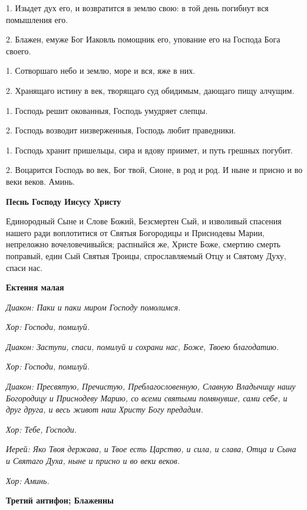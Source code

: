 1. Изыдет дух его, и возвратится в землю свою: в той день погибнут вся помышления его. 


2. Блажен, емуже Бог Иаковль помощник его, упование его на Господа Бога своего. 


1. Сотворшаго небо и землю, море и вся, яже в них. 


2. Хранящаго истину в век, творящаго суд обидимым, дающаго пищу алчущим. 


1. Господь решит окованныя, Господь умудряет слепцы. 


2. Господь возводит низверженныя, Господь любит праведники. 


1. Господь хранит пришельцы, сира и вдову приимет, и путь грешных погубит. 


2. Воцарится Господь во век, Бог твой, Сионе, в род и род. И ныне и присно и во веки веков. Аминь. 


\medskip
\bfseries Песнь Господу Иисусу Христу \normalfont{}\nopagebreak


Единородный Сыне и Слове Божий, Безсмертен Сый, и изволивый спасения нашего ради воплотитися от Святыя Богородицы и Приснодевы Марии, непреложно вочеловечивыйся; распныйся же, Христе Боже, смертию смерть поправый, един Сый Святыя Троицы, спрославляемый Отцу и Святому Духу, спаси нас. 


\medskip
\bfseries Ектения малая \normalfont{}\nopagebreak


\itshape Диакон:\normalfont{} Паки и паки миром Господу помолимся. 


\itshape Хор:\normalfont{} Господи, помилуй. 


\itshape Диакон:\normalfont{} Заступи, спаси, помилуй и сохрани нас, Боже, Твоею благодатию. 


\itshape Хор:\normalfont{} Господи, помилуй. 


\itshape Диакон:\normalfont{} Пресвятую, Пречистую, Преблагословенную, Славную Владычицу нашу Богородицу и Приснодеву Марию, со всеми святыми помянувше, сами себе, и друг друга, и весь живот наш Христу Богу предадим.


\itshape Хор:\normalfont{} Тебе, Господи. 


\itshape Иерей:\normalfont{} Яко Твоя держава, и Твое есть Царство, и сила, и слава, Отца и Сына и Святаго Духа, ныне и присно и во веки веков. 


\itshape Хор:\normalfont{} Аминь.


\medskip
\bfseries Третий антифон; Блаженны \normalfont{}\nopagebreak


